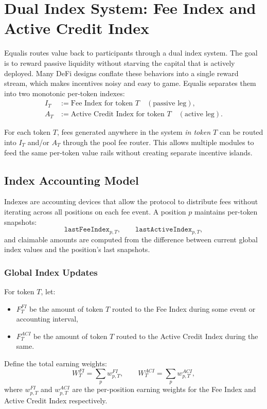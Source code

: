 \documentclass[version=preprint]{iacrcc}
\begin{document}
\section{Dual Index System: Fee Index and Active Credit Index}

Equalis routes value back to participants through a dual index system. The goal is to reward passive liquidity without starving the capital that is actively deployed. Many DeFi designs conflate these behaviors into a single reward stream, which makes incentives noisy and easy to game. Equalis separates them into two monotonic per-token indexes:
\begin{align*}
I_T &:= \text{Fee Index for token } T \quad (\text{passive leg}),\\
A_T &:= \text{Active Credit Index for token } T \quad (\text{active leg}).
\end{align*}

For each token $T$, fees generated anywhere in the system \emph{in token $T$} can be routed into $I_T$ and/or $A_T$ through the pool fee router. This allows multiple modules to feed the same per-token value rails without creating separate incentive islands.

\subsection{Index Accounting Model}

Indexes are accounting devices that allow the protocol to distribute fees without iterating across all positions on each fee event. A position $p$ maintains per-token snapshots:
\[
\texttt{lastFeeIndex}_{p,T}, \qquad \texttt{lastActiveIndex}_{p,T},
\]
and claimable amounts are computed from the difference between current global index values and the position’s last snapshots.

\subsubsection{Global Index Updates}

For token $T$, let:
\begin{itemize}
  \item $F^{FI}_T$ be the amount of token $T$ routed to the Fee Index during some event or accounting interval,
  \item $F^{ACI}_T$ be the amount of token $T$ routed to the Active Credit Index during the same.
\end{itemize}

Define the total earning weights:
\[
W^{FI}_T = \sum_{p} w^{FI}_{p,T}, \qquad
W^{ACI}_T = \sum_{p} w^{ACI}_{p,T},
\]
where $w^{FI}_{p,T}$ and $w^{ACI}_{p,T}$ are the per-position earning weights for the Fee Index and Active Credit Index respectively.
\end{document}
